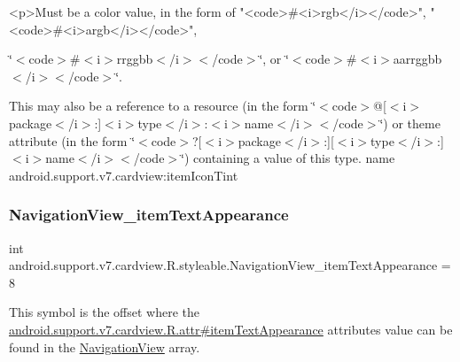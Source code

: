 \begin{DoxyVerb}      <p>Must be a color value, in the form of "<code>#<i>rgb</i></code>", "<code>#<i>argb</i></code>",
\end{DoxyVerb}
 \char`\"{}$<$code$>$\#$<$i$>$rrggbb$<$/i$>$$<$/code$>$\char`\"{}, or \char`\"{}$<$code$>$\#$<$i$>$aarrggbb$<$/i$>$$<$/code$>$\char`\"{}. 

This may also be a reference to a resource (in the form \char`\"{}$<$code$>$@\mbox{[}$<$i$>$package$<$/i$>$\+:\mbox{]}$<$i$>$type$<$/i$>$\+:$<$i$>$name$<$/i$>$$<$/code$>$\char`\"{}) or theme attribute (in the form \char`\"{}$<$code$>$?\mbox{[}$<$i$>$package$<$/i$>$\+:\mbox{]}\mbox{[}$<$i$>$type$<$/i$>$\+:\mbox{]}$<$i$>$name$<$/i$>$$<$/code$>$\char`\"{}) containing a value of this type.  name android.\+support.\+v7.\+cardview\+:item\+Icon\+Tint \mbox{\label{classandroid_1_1support_1_1v7_1_1cardview_1_1R_1_1styleable_accea89723b4cae7ef54ab62b0612c117}} 
\subsubsection{\texorpdfstring{Navigation\+View\+\_\+item\+Text\+Appearance}{NavigationView\_itemTextAppearance}}
{\footnotesize\ttfamily int android.\+support.\+v7.\+cardview.\+R.\+styleable.\+Navigation\+View\+\_\+item\+Text\+Appearance = 8\hspace{0.3cm}{\ttfamily [static]}}

This symbol is the offset where the \hyperlink{classandroid_1_1support_1_1v7_1_1cardview_1_1R_1_1attr_abfcdf49cb02e19d0dd2116941f919c40}{android.\+support.\+v7.\+cardview.\+R.\+attr\#item\+Text\+Appearance} attribute\textquotesingle{}s value can be found in the \hyperlink{classandroid_1_1support_1_1v7_1_1cardview_1_1R_1_1styleable_aab4216e563b2e19093e1d57494734202}{Navigation\+View} array.

